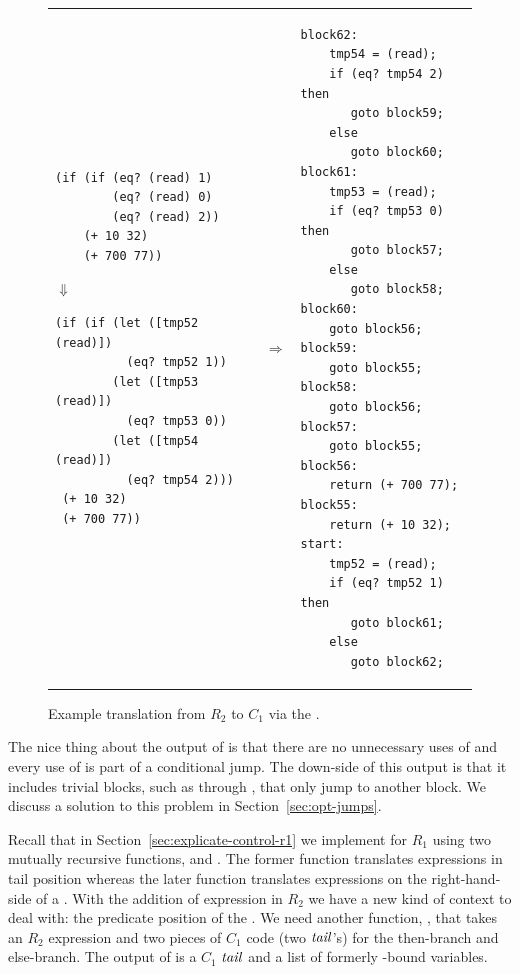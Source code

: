 \documentclass[11pt]{book}
\begin{document}
\begin{figure}[tbp]
\begin{tabular}{lll}
\begin{minipage}{0.4\textwidth}
\begin{lstlisting}
(if (if (eq? (read) 1)
        (eq? (read) 0)
        (eq? (read) 2))
    (+ 10 32)
    (+ 700 77))
\end{lstlisting}
\hspace{40pt}$\Downarrow$
\begin{lstlisting}
(if (if (let ([tmp52 (read)])
          (eq? tmp52 1))
        (let ([tmp53 (read)]) 
          (eq? tmp53 0))
        (let ([tmp54 (read)]) 
          (eq? tmp54 2)))
 (+ 10 32)
 (+ 700 77))
\end{lstlisting}
\end{minipage}
&
$\Rightarrow$
&
\begin{minipage}{0.55\textwidth}
\begin{lstlisting}
block62:
    tmp54 = (read);
    if (eq? tmp54 2) then
       goto block59;
    else
       goto block60;
block61:
    tmp53 = (read);
    if (eq? tmp53 0) then
       goto block57;
    else
       goto block58;
block60:
    goto block56;
block59:
    goto block55;
block58:
    goto block56;
block57:
    goto block55;
block56:
    return (+ 700 77);
block55:
    return (+ 10 32);
start:
    tmp52 = (read);
    if (eq? tmp52 1) then
       goto block61;
    else
       goto block62;
\end{lstlisting}
\end{minipage}
\end{tabular} 

\caption{Example translation from $R_2$ to $C_1$
  via the .}
\label{fig:explicate-control-s1-38}
\end{figure}

The nice thing about the output of  is that
there are no unnecessary uses of  and every use of
 is part of a conditional jump. The down-side of this output
is that it includes trivial blocks, such as  through
, that only jump to another block. We discuss a solution
to this problem in Section~\ref{sec:opt-jumps}.

Recall that in Section~\ref{sec:explicate-control-r1} we implement
 for $R_1$ using two mutually recursive
functions,  and .  The
former function translates expressions in tail position whereas the
later function translates expressions on the right-hand-side of a
. With the addition of  expression in $R_2$ we have a
new kind of context to deal with: the predicate position of the
. We need another function, , that takes
an $R_2$ expression and two pieces of $C_1$ code (two $\mathit{tail}$'s) for
the then-branch and else-branch. The output of 
is a $C_1$ $\mathit{tail}$ and a list of formerly -bound variables.
\end{document}
